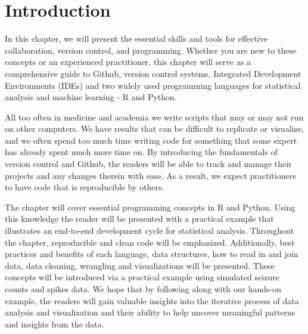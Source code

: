 \section{Introduction}
In this chapter, we will present the essential skills and tools for effective collaboration, version control, and programming. Whether you are new to these concepts or an experienced practitioner, this chapter will serve as a comprehensive guide to Github, version control systems, Integrated Development Environments (IDEs) and two widely used programming languages for statistical analysis and machine learning - R and Python.

All too often in medicine and academia we write scripts that may or may not run on other computers. We have results that can be difficult to replicate or visualize, and we often spend too much time writing code for something that some expert has already spent much more time on. By introducing the fundamentals of version control and Github, the readers will be able to track and manage their projects and any changes therein with ease. As a result, we expect practitioners to have code that is reproducible by others.

The chapter will cover essential programming concepts in R and Python. Using this knowledge the reader will be presented with a practical example that illustrates an end-to-end development cycle for statistical analysis. Throughout the chapter, reproducible and clean code will be emphasized. Additionally, best practices and benefits of each language, data structures, how to read in and join data, data cleaning, wrangling and visualizations will be presented. These concepts will be introduced via a practical example using simulated seizure counts and spikes data. We hope that by following along with our hands-on example, the readers will gain valuable insights into the iterative process of data analysis and visualization and their ability to help uncover meaningful patterns and insights from the data.
